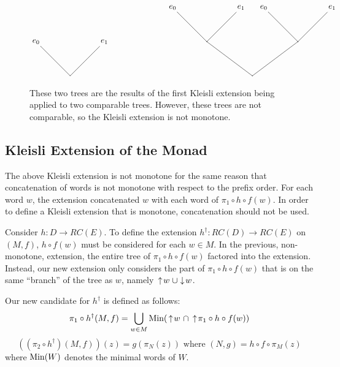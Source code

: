 \begin{figure}
\[
\begin{xy}
(0,15)*+{e_0} = "v1";%
(30,15)*+{e_1} = "v2";%
(15,0)*{} = "v3";%
(60,30)*+{e_0} = "v4";%
(90,30)*+{e_1} = "v5";%
(100,30)*+{e_0} = "v6";%
(130,30)*+{e_1} = "v7";%
(75,15)*{} = "v8";%
(115,15)*{} = "v9";%
(95,0)*{} = "v10";%
{\ar@{-} "v3"; "v1"};%
{\ar@{-} "v3"; "v2"};%
{\ar@{-} "v9"; "v6"};%
{\ar@{-} "v9"; "v7"};%
{\ar@{-} "v8"; "v5"};%
{\ar@{-} "v8"; "v4"};%
{\ar@{-} "v10"; "v8"};%
{\ar@{-} "v10"; "v9"};
\end{xy}
\]
\caption[A Counterexample for the First Kleisli Extension]{These two trees are the results of the first Kleisli extension being applied to two comparable trees.  However, these trees are not comparable, so the Kleisli extension is not monotone.} 
\label{CounterexampleTrees}
\end{figure}

\subsection{Kleisli Extension of the Monad}\label{notation}

The above Kleisli extension is not monotone for the same reason that concatenation of words is not monotone with respect to the prefix order.  For each word $w$, the extension concatenated $w$ with each word of $\pi_1\circ h\circ f(w)$.  In order to define a Kleisli extension that is monotone, concatenation should not be used.

Consider $h:D\rightarrow RC(E)$. To define the extension $h^\dagger: RC(D)\rightarrow RC(E)$ on $(M, f)$, 
$h\circ f(w)$ must be considered for each $w\in M$.  In the previous, non-monotone, extension, 
the entire tree of $\pi_1\circ h\circ f(w)$ factored into the extension.  Instead, our new extension only considers the part of 
$\pi_1\circ h\circ f(w)$ that is on the same ``branch'' of the tree as $w$, namely $\,\uparrow\! w\; \cup\! \,\downarrow\! w$.  

Our new candidate for $h^\dagger$ is defined as follows:
\[\pi_1\circ h^\dagger(M,f) = \bigcup_{w\in M} \textrm{Min}(\,\uparrow\! w\ \cap  
\,\uparrow\!\pi_1 \circ h\circ f(w))\]
\[((\pi_2\circ h^\dagger)(M,f))(z) = g(\pi_N(z)) \textrm{ where } (N, g) = h\circ f\circ \pi_M(z)\]
where $\textrm{Min}(W)$ denotes the minimal words of $W$.

